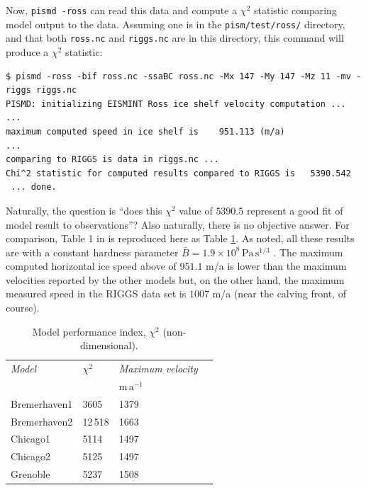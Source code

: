 \documentclass[11pt,final]{amsart}
\begin{document}
Now, \verb|pismd -ross| can read this data and compute a $\chi^2$ statistic comparing model output to the data.  Assuming one is in the \verb|pism/test/ross/| directory, and that both \verb|ross.nc| and \verb|riggs.nc| are in this directory, this command will produce a $\chi^2$ statistic:

\small\begin{verbatim}
$ pismd -ross -bif ross.nc -ssaBC ross.nc -Mx 147 -My 147 -Mz 11 -mv -riggs riggs.nc
PISMD: initializing EISMINT Ross ice shelf velocity computation ...
...
maximum computed speed in ice shelf is    951.113 (m/a)
...
comparing to RIGGS is data in riggs.nc ...
Chi^2 statistic for computed results compared to RIGGS is   5390.542
 ... done.
\end{verbatim}
\normalsize

Naturally, the question is ``does this $\chi^2$ value of $5390.5$ represent a good fit of model result to observations''?  Also naturally, there is no objective answer.  For comparison, Table 1 in \cite{MacAyealetal} is reproduced here as Table \ref{tab:chisqr}.  As noted, all these results are with a constant hardness parameter $\bar B = 1.9 \times 10^8 \, \text{Pa}\, \text{s}^{1/3}$ \cite{MacAyealetal}.  The maximum computed horizontal ice speed above of $951.1$ m/a is lower than the maximum velocities reported by the other models but, on the other hand, the maximum measured speed in the RIGGS data set is $1007$ m/a (near the calving front, of course).

\small
\begin{table}[ht]
\caption{Model performance index, $\chi^2$ (non-dimensional).  }\label{tab:chisqr}
\begin{tabular}{@{}llll}\hline
\textsl{Model} & $\chi^2$ & \textsl{Maximum velocity} \\
 & & $\text{m}\,\text{a}^{-1}$ \\ \hline
Bremerhaven1 & 3605 & 1379 \\
Bremerhaven2 & 12\,518 & 1663 \\
Chicago1 & 5114 & 1497 \\
Chicago2 & 5125 & 1497 \\
Grenoble & 5237 & 1508 \\
\hline
\end{tabular}
\end{table}
\normalsize
\end{document}
